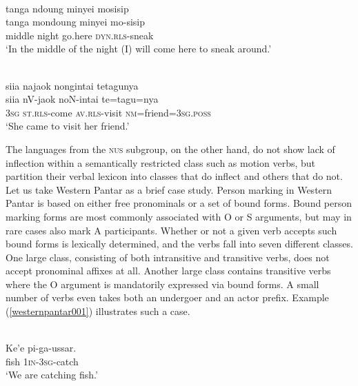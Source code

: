\ea \label{tajio001}
\\
\glll tanga ndoung minyei mosisip \\
tanga mondoung minyei mo-sisip \\
middle night go.here \textsc{dyn}.\textsc{rls}-sneak \\
\glft `In the middle of the night (I) will come here to sneak around.’\\ 
\z

\ea \label{tajio002}
\\
\glll siia najaok nongintai tetagunya \\
siia nV-jaok noN-intai te=tagu=nya \\
\textsc{3}\textsc{sg} \textsc{st}.\textsc{rls}-come \textsc{av}.\textsc{rls}-visit \textsc{nm}=friend=\textsc{3}\textsc{sg}.\textsc{poss} \\
\glft `She came to visit her friend.’\\ 
\z

The languages from the \textsc{nus} subgroup, on the other hand, do not show lack of inflection within a semantically restricted class such as motion verbs, but partition their verbal lexicon into classes that do inflect and others that do not. Let us take Western Pantar \citep{holton2010person, holton2014western} as a brief case study. Person marking in Western Pantar is based on either free pronominals or a set of bound forms. Bound person marking forms are most commonly associated with O or S arguments, but may in rare cases also mark A participants. Whether or not a given verb accepts such bound forms is lexically determined, and the verbs fall into seven different classes. One large class, consisting of both intransitive and transitive verbs, does not accept pronominal affixes at all. Another large class contains transitive verbs where the O argument is mandatorily expressed via bound forms. A small number of verbs even takes both an undergoer and an actor prefix. Example (\ref{westernpantar001}) illustrates such a case.

\ea \label{westernpantar001}
\\
\gll Ke'e pi-ga-ussar. \\
fish 1\textsc{in}-3\textsc{sg}-catch \\
\glft `We are catching fish.'\\ 
\z

